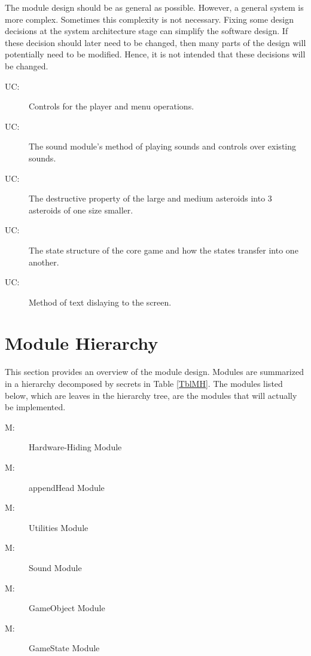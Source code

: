 \documentclass[12pt, titlepage]{article}
\newcounter{ucnum}
\newcommand{\uctheucnum}{UC\theucnum}
\newcounter{mnum}
\newcommand{\mthemnum}{M\themnum}
\begin{document}
The module design should be as general as possible. However, a general system is more complex. Sometimes this complexity is not necessary. Fixing some design decisions at the system architecture stage can simplify the software design. If these decision should later need to be changed, then many parts of the design will potentially need to be modified. Hence, it is not intended that these decisions will be changed.

\begin{description}
\item[ \uctheucnum \label{ucUtilities}:] Controls for the player and menu operations.
\item[ \uctheucnum \label{ucSound}:] The sound module's method of playing sounds and controls over existing sounds.
\item[ \uctheucnum \label{ucGameobject}:] The destructive property of the large and medium asteroids into 3 asteroids of one size smaller.
\item[ \uctheucnum \label{ucGamestate}:] The state structure of the core game and how the states transfer into one another.
\item[ \uctheucnum \label{ucGamestate}:] Method of text dislaying to the screen.
\end{description}

\section{Module Hierarchy} \label{SecMH}

This section provides an overview of the module design. Modules are summarized
in a hierarchy decomposed by secrets in Table \ref{TblMH}. The modules listed
below, which are leaves in the hierarchy tree, are the modules that will
actually be implemented.

\begin{description}
\item [ \mthemnum \label{mHH}:] Hardware-Hiding Module
\item [ \mthemnum \label{mBHa}:] appendHead Module
\item [ \mthemnum \label{mBHu}:] Utilities Module
\item [ \mthemnum \label{mBHs}:] Sound Module
\item [ \mthemnum \label{mSDgo}:] GameObject Module
\item [ \mthemnum \label{mSDgs}:] GameState Module
\end{description}
\end{document}
